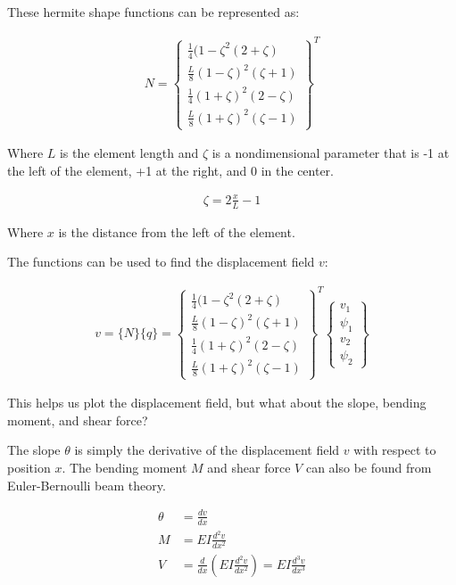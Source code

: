 \documentclass[10pt,letterpaper]{article}
\begin{document}
	These hermite shape functions can be represented as:

	\begin{align}
		N = \begin{Bmatrix}
				\frac{1}{4} (1-\zeta^2 (2+\zeta) \\
				\frac{L}{8} (1-\zeta)^2 (\zeta+1) \\
				\frac{1}{4} (1+\zeta)^2 (2-\zeta) \\
				\frac{L}{8} (1+\zeta)^2 (\zeta-1) 
		\end{Bmatrix}^T
	\end{align}

	Where $L$ is the element length and $\zeta$ is a nondimensional parameter that is -1 at the left of the element, +1 at the right, and 0 in the center.

	\begin{align}
		\zeta = 2 \frac{x}{L} - 1
	\end{align}

	Where $x$ is the distance from the left of the element.

	The functions can be used to find the displacement field $v$:

	\begin{align}
		v = \{N\} \{q\} =
		\begin{Bmatrix}
				\frac{1}{4} (1-\zeta^2 (2+\zeta) \\
				\frac{L}{8} (1-\zeta)^2 (\zeta+1) \\
				\frac{1}{4} (1+\zeta)^2 (2-\zeta) \\
				\frac{L}{8} (1+\zeta)^2 (\zeta-1) 
		\end{Bmatrix}^T 
		\begin{Bmatrix}
			v_1 \\
			\psi_1 \\
			v_2 \\
			\psi_2 
		\end{Bmatrix}
	\end{align}

	This helps us plot the displacement field, but what about the slope, bending moment, and shear force?

	The slope $\theta$ is simply the derivative of the displacement field $v$ with respect to position $x$. The bending moment $M$ and shear force $V$ can also be found from Euler-Bernoulli beam theory.

	\begin{align}
		\theta &= \frac{d v}{d x} \\
		M      &= E I \frac{d^2 v}{d x^2} \\
		V      &= \frac{d}{d x} (E I \frac{d^2 v}{d x^2}) = E I \frac{d^3 v}{d x^3}
	\end{align}
\end{document}
